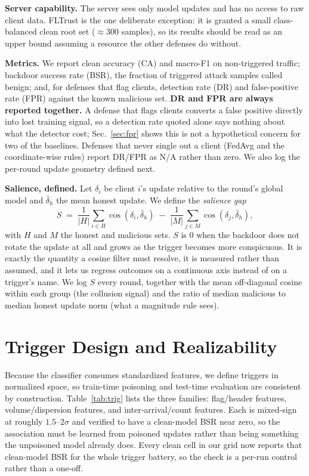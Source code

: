 \textbf{Server capability.} The server sees only model updates and has no access
to raw client data. FLTrust is the one deliberate exception: it is granted a
small class-balanced clean root set ($\approx$300 samples), so its results should
be read as an upper bound assuming a resource the other defenses do without.

\textbf{Metrics.} We report clean accuracy (CA) and macro-F1 on non-triggered
traffic; backdoor success rate (BSR), the fraction of triggered attack samples
called benign; and, for defenses that flag clients, detection rate (DR) and
false-positive rate (FPR) against the known malicious set. \textbf{DR and FPR are
always reported together.} A defense that flags clients converts a false positive
directly into lost training signal, so a detection rate quoted alone says nothing
about what the detector cost; Sec.~\ref{sec:fpr} shows this is not a hypothetical
concern for two of the baselines. Defenses that never single out a client
(FedAvg and the coordinate-wise rules) report DR/FPR as N/A rather than zero. We
also log the per-round update geometry defined next.

\textbf{Salience, defined.} Let $\delta_i$ be client $i$'s update relative to the
round's global model and $\bar\delta_h$ the mean honest update. We define the
\emph{salience gap}
\begin{equation}
\label{eq:salience}
S \;=\; \frac{1}{|H|}\sum_{i\in H}\cos(\delta_i,\bar\delta_h)
      \;-\; \frac{1}{|M|}\sum_{j\in M}\cos(\delta_j,\bar\delta_h),
\end{equation}
with $H$ and $M$ the honest and malicious sets. $S$ is $0$ when the backdoor does
not rotate the update at all and grows as the trigger becomes more conspicuous.
It is exactly the quantity a cosine filter must resolve, it is measured rather
than assumed, and it lets us regress outcomes on a continuous axis instead of on
a trigger's name. We log $S$ every round, together with the mean off-diagonal
cosine within each group (the collusion signal) and the ratio of median malicious
to median honest update norm (what a magnitude rule sees).

\section{Trigger Design and Realizability}
\label{sec:realizable}

Because the classifier consumes standardized features, we define triggers in
normalized space, so train-time poisoning and test-time evaluation are consistent
by construction. Table~\ref{tab:trig} lists the three families: flag/header
features, volume/dispersion features, and inter-arrival/count features. Each is
mixed-sign at roughly $1.5$--$2\sigma$ and verified to have a clean-model BSR near
zero, so the association must be learned from poisoned updates rather than being
something the unpoisoned model already does. Every clean cell in our grid now
reports that clean-model BSR for the whole trigger battery, so the check is a
per-run control rather than a one-off.

